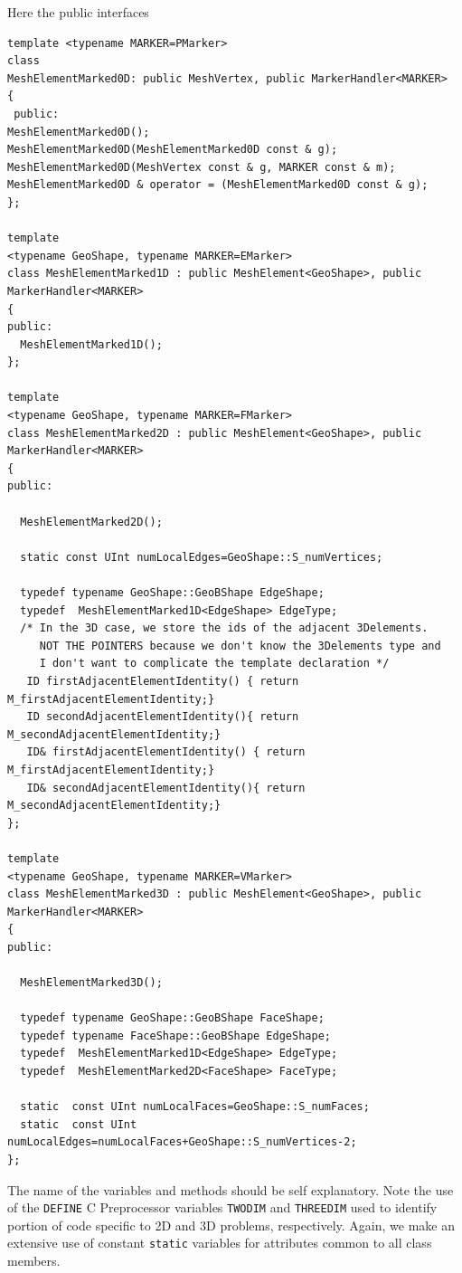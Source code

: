 Here the public interfaces
\begin{verbatim}
template <typename MARKER=PMarker>
class 
MeshElementMarked0D: public MeshVertex, public MarkerHandler<MARKER>
{
 public:
MeshElementMarked0D();
MeshElementMarked0D(MeshElementMarked0D const & g);
MeshElementMarked0D(MeshVertex const & g, MARKER const & m);
MeshElementMarked0D & operator = (MeshElementMarked0D const & g);
};

template 
<typename GeoShape, typename MARKER=EMarker>
class MeshElementMarked1D : public MeshElement<GeoShape>, public MarkerHandler<MARKER>
{
public:
  MeshElementMarked1D();
};

template 
<typename GeoShape, typename MARKER=FMarker>
class MeshElementMarked2D : public MeshElement<GeoShape>, public MarkerHandler<MARKER>
{
public:

  MeshElementMarked2D();

  static const UInt numLocalEdges=GeoShape::S_numVertices;

  typedef typename GeoShape::GeoBShape EdgeShape;
  typedef  MeshElementMarked1D<EdgeShape> EdgeType;
  /* In the 3D case, we store the ids of the adjacent 3Delements.
     NOT THE POINTERS because we don't know the 3Delements type and 
     I don't want to complicate the template declaration */
   ID firstAdjacentElementIdentity() { return M_firstAdjacentElementIdentity;}
   ID secondAdjacentElementIdentity(){ return M_secondAdjacentElementIdentity;}
   ID& firstAdjacentElementIdentity() { return M_firstAdjacentElementIdentity;}
   ID& secondAdjacentElementIdentity(){ return M_secondAdjacentElementIdentity;}
};

template 
<typename GeoShape, typename MARKER=VMarker>
class MeshElementMarked3D : public MeshElement<GeoShape>, public MarkerHandler<MARKER>
{
public:
  
  MeshElementMarked3D();

  typedef typename GeoShape::GeoBShape FaceShape;
  typedef typename FaceShape::GeoBShape EdgeShape;
  typedef  MeshElementMarked1D<EdgeShape> EdgeType;
  typedef  MeshElementMarked2D<FaceShape> FaceType;

  static  const UInt numLocalFaces=GeoShape::S_numFaces;
  static  const UInt numLocalEdges=numLocalFaces+GeoShape::S_numVertices-2;
};
\end{verbatim}
The name of the variables and methods should be self explanatory.
Note the use of the \texttt{DEFINE} C Preprocessor variables
\texttt{TWODIM} and \texttt{THREEDIM} used to identify portion of code
specific to 2D and 3D problems, respectively.  Again, we make an
extensive use of constant \texttt{static} variables for attributes
common to all class members. 

